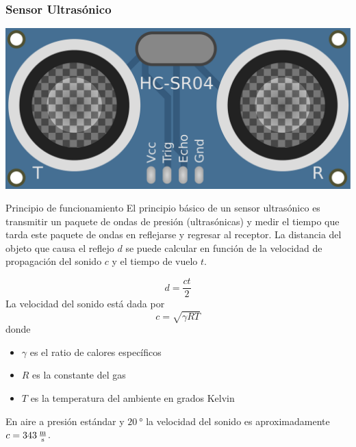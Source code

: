 \begin{frame}
    \frametitle{Sensor Ultrasónico}
    \scriptsize
    
    \begin{center}
        \includegraphics[width=0.2\columnwidth]{images/ultrasonic_sensor.pdf}
    \end{center}
    
    
    \begin{block}{Principio de funcionamiento}
        El principio básico de un sensor ultrasónico es transmitir un paquete de ondas de presión (ultrasónicas) y medir el tiempo que tarda este paquete de ondas en reflejarse y regresar al receptor. La distancia del objeto que causa el reflejo  $d$ se puede calcular en función de la velocidad de propagación del sonido $c$ y el tiempo de vuelo $t$.
   
        \begin{equation*}
            d = \dfrac{c t}{2}
        \end{equation*}
        La velocidad del sonido está dada por
        \begin{equation*}
            c = \sqrt{\gamma R T}
        \end{equation*}
        donde
        \begin{itemize}
            \item $\gamma$ es el ratio de calores específicos\\
            \item $R$ es la constante del gas\\
            \item $T$ es la temperatura del ambiente en grados Kelvin
        \end{itemize}
            
        En aire a presión estándar y $\SI{20}{\degree}$ la velocidad del sonido es aproximadamente $c = \SI{343}{\meter\over\second}$.
    \end{block}
\end{frame}
